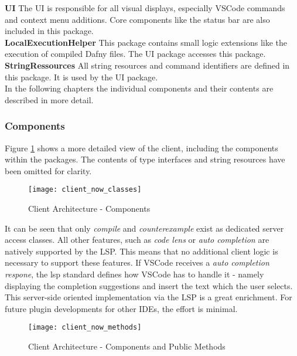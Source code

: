 {\bf UI} \textendash{}
The UI is responsible for all visual displays, especially VSCode commands and context menu additions. Core components like the status bar are also included in this package. \\

{\bf LocalExecutionHelper} \textendash{}
This package contains small logic extensions like the execution of compiled Dafny files. The UI package accesses this package. \\

{\bf StringRessources} \textendash{}
All string resources and command identifiers are defined in this package. It is used by the UI package. \\

In the following chapters the individual components and their contents are described in more detail.

\subsubsection{Components}
Figure \ref{fig:client_now_classes} shows a more detailed view of the client, including the components within the packages. The contents of type interfaces and string resources have been omitted for clarity. \\

\begin{figure}[H]
    \centering
    \texttt{[image: client\_now\_classes]}
    \caption{Client Architecture - Components}
    \label{fig:client_now_classes}
\end{figure}

It can be seen that only \textit{compile} and \textit{counterexample} exist as dedicated server access classes. All other features, such as \textit{code lens} or \textit{auto completion} are natively supported by the LSP. This means that no additional client logic is necessary to support these features. If VSCode receives a \textit{auto completion respone}, the lsp standard defines how VSCode has to handle it - namely displaying the completion suggestions and insert the text which the user selects. This server-side oriented implementation via the LSP is a great enrichment. For future plugin developments for other IDEs, the effort is minimal.

\begin{figure}[H]
    \centering
    \texttt{[image: client\_now\_methods]}
    \caption{Client Architecture - Components and Public Methods}
    \label{fig:client_now_methods}
\end{figure}

